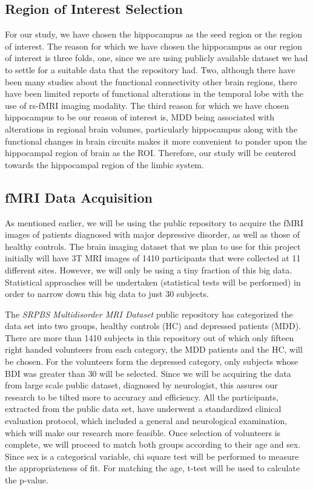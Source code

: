 \documentclass[12pt]{article}
\begin{document}
\subsection{Region of Interest Selection}

For our study, we have chosen the hippocampus as the seed region or
the region of interest. The reason for which we have chosen the
hippocampus as our region of interest is three folds, one, since we
are using publicly available dataset we had to settle for a suitable
data that the repository had. Two, although there have been many
studies about the functional connectivity other brain regions, there
have been limited reports of functional alterations in the temporal
lobe with the use of rs-fMRI imaging modality. The third reason for
which we have chosen hippocampus to be our reason of interest is, MDD
being associated with alterations in regional brain volumes,
particularly hippocampus along with the functional changes in brain
circuits makes it more convenient to ponder upon the hippocampal
region of brain as the ROI. Therefore, our study will be centered
towards the hippocampal region of the limbic system.

\subsection{fMRI Data Acquisition}

As mentioned earlier, we will be using the \textcite{dataset} public
repository to acquire the fMRI images of patients diagnosed with major
depressive disorder, as well as those of healthy controls. The brain
imaging dataset that we plan to use for this project initially will
have 3T MRI images of 1410 participants that were collected at 11
different sites. However, we will only be using a tiny fraction of
this big data. Statistical approaches will be undertaken (statistical
tests will be performed) in order to narrow down this big data to just
30 subjects.

\enlargethispage{\baselineskip} The \textit{SRPBS Multidisorder MRI
Dataset} public repository has categorized the data set into two
groups, healthy controls (HC) and depressed patients (MDD). There are
more than 1410 subjects in this repository out of which only fifteen
right handed volunteers from each category, the MDD patients and the
HC, will be chosen. For the volunteers form the depressed category,
only subjects whose BDI was greater than 30 will be selected. Since we
will be acquiring the data from large scale public dataset, diagnosed
by neurologist, this assures our research to be tilted more to
accuracy and efficiency. All the participants, extracted from the
public data set, have underwent a standardized clinical evaluation
protocol, which included a general and neurological examination, which
will make our research more feasible. Once selection of volunteers is
complete, we will proceed to match both groups according to their age
and sex. Since sex is a categorical variable, chi square test will be
performed to measure the appropriateness of fit. For matching the age,
t-test will be used to calculate the p-value.
\end{document}
